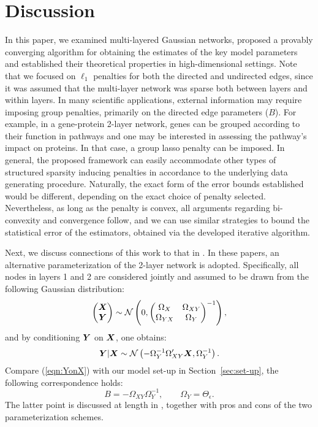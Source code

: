 \section{Discussion}\label{sec:grouping}

In this paper, we examined multi-layered Gaussian networks, proposed a provably converging algorithm for obtaining 
the estimates of the key model parameters and established their theoretical properties in  high-dimensional settings.
Note that we focused on $\ell_1$ penalties for both the directed and undirected edges, since it was assumed that the multi-layer network was sparse both between layers and within layers. In many scientific applications, external information may require
imposing group penalties, primarily on the directed edge parameters ($B$). For example, in a gene-protein 2-layer network, genes
can be grouped according to their function in pathways and one may be interested in assessing the pathway's impact on proteins.
In that case, a group lasso penalty can be imposed. In general, the proposed framework can easily accommodate 
other types of structured sparsity inducing penalties in accordance to the underlying data generating procedure. 
Naturally, the exact form of the error bounds
established would be different, depending on the exact choice of penalty selected. Nevertheless, as long as the penalty is convex, all arguments regarding bi-convexity and convergence follow, and we can use similar strategies to bound the statistical error of the estimators, obtained via the developed iterative algorithm.

Next, we discuss connections of this work to that in \citet{sohn2012joint,yuan2014partial,mccarter2014sparse}. In these papers,
an alternative parameterization of the 2-layer network is adopted. Specifically, all nodes in layers 1 and 2 are considered
jointly and assumed to be drawn from the following Gaussian distribution:
\begin{equation*}
\begin{pmatrix}
\boldsymbol{X} \\ \boldsymbol{Y}
\end{pmatrix}\sim \mathcal{N}\left( 0, \begin{pmatrix}
\Omega_{X} & \Omega_{XY} \\ \Omega_{YX} & \Omega_{Y}
\end{pmatrix}^{-1} \right), 
\end{equation*}
and by conditioning $\boldsymbol{Y}$ on $\boldsymbol{X}$, one obtains:
\begin{equation}\label{eqn:YonX}
\boldsymbol{Y}|\boldsymbol{X} \sim \mathcal{N}\left(-\Omega_Y^{-1} \Omega'_{XY} \boldsymbol{X},  \Omega_Y^{-1}\right).
\end{equation}
Compare (\ref{eqn:YonX}) with our model set-up in Section~\ref{sec:set-up}, the following correspondence holds:
\begin{equation}\label{eqn:correspondence}
B = - \Omega_{XY}\Omega_{Y}^{-1}, \qquad \Omega_Y = \Theta_\epsilon. 
\end{equation}
The latter point is discussed at length in \cite{andersson2001alternative}, together with pros and cons of the two parameterization
schemes. 

